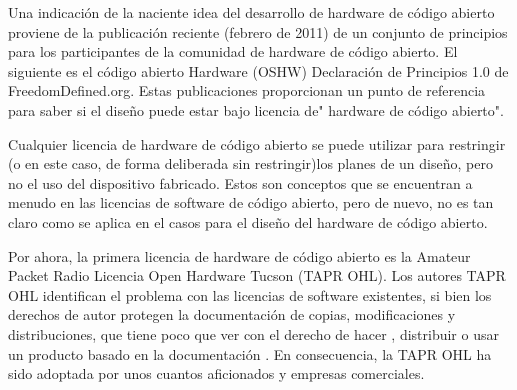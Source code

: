 Una indicación de la naciente idea del desarrollo de hardware de código abierto proviene de la publicación reciente (febrero de 2011) de un conjunto de principios para los participantes de la comunidad de hardware de código abierto. El siguiente es el código abierto Hardware (OSHW) Declaración de Principios 1.0 de FreedomDefined.org. Estas publicaciones proporcionan un punto de referencia para saber si el diseño puede estar bajo licencia de" hardware de código abierto".


Cualquier licencia de hardware de código abierto se puede utilizar para restringir (o en este caso, de forma deliberada sin restringir)los planes de un diseño, pero no el uso del dispositivo fabricado. Estos son conceptos que se encuentran a menudo en las licencias de software de código abierto, pero de nuevo, no es tan claro como se aplica en el casos para el diseño del hardware de código abierto.

Por ahora, la primera licencia de hardware de código abierto es la  Amateur Packet Radio Licencia Open Hardware Tucson (TAPR OHL). Los autores TAPR OHL  identifican el problema con las licencias de software existentes, si bien los derechos de autor protegen la documentación de copias, modificaciones y distribuciones, que tiene poco que ver con el derecho de hacer , distribuir o usar un producto basado en la documentación \cite{Etiqueta12}.
En consecuencia, la TAPR OHL ha sido adoptada por unos cuantos aficionados y empresas comerciales.

